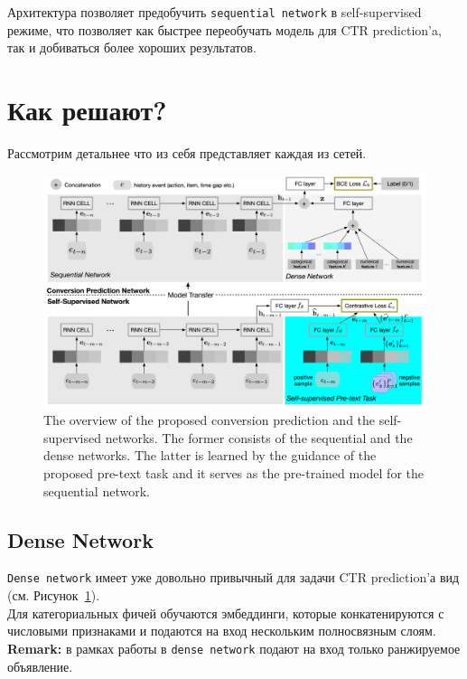 Архитектура позволяет предобучить \texttt{sequential network} в self-supervised режиме, что позволяет как быстрее переобучать модель для CTR prediction'a, так и добиваться более хороших результатов.

\section*{Как решают?}

Рассмотрим детальнее что из себя представляет каждая из сетей. 

\begin{figure}[ht]
    \centering
    \includegraphics[width=1.0\linewidth]{images/pretraining.png}
    \caption{\small{The overview of the proposed conversion prediction and the self-supervised networks. The former consists of the sequential and the dense networks. The latter is learned by the guidance of the proposed pre-text task and it serves as the pre-trained model for the sequential network.}}
    \label{fig:pretrainig}
\end{figure}

\subsection*{Dense Network}

\texttt{Dense network} имеет уже довольно привычный для задачи CTR prediction'а вид (см. Рисунок~\ref{fig:pretrainig}). \\

Для категориальных фичей обучаются эмбеддинги, которые конкатенируются с числовыми признаками и подаются на вход нескольким полносвязным слоям. \\

{\bf Remark:} в рамках работы в \texttt{dense network} подают на вход только ранжируемое объявление.

